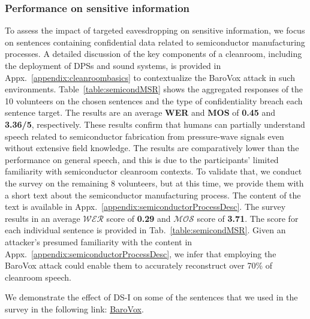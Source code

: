 {{\subsubsection{\textbf{Performance on sensitive information}}
To assess the impact of targeted eavesdropping on sensitive information, we focus on sentences containing confidential data related to semiconductor manufacturing processes. A detailed discussion of the key components of a cleanroom, including the deployment of DPSs and sound systems, is provided in Appx.~\ref{appendix:cleanroombasics} to contextualize the BaroVox attack in such environments.
Table~\ref{table:semicondMSR} shows the aggregated responses of the 10 volunteers on the chosen sentences and the type of confidentiality breach each sentence target. The results are an average \textbf{WER} and \textbf{MOS} of \textbf{0.45} and \textbf{3.36/5}, respectively. These results confirm that humans can partially understand speech related to semiconductor fabrication from pressure-wave signals even without extensive field knowledge. The results are comparatively lower than the performance on general speech,  and this is due to the participants' limited familiarity with semiconductor cleanroom contexts. To validate that, we conduct the survey on the remaining 8 volunteers, but at this time, we provide them with a short text about the semiconductor manufacturing process. The content of the text is available in Appx.~\ref{appendix:semiconductorProcessDesc}. The survey results in an average \textbf{$\mathcal{WER}$} score of \textbf{0.29} and \textbf{$\mathcal{MOS}$} score of \textbf{3.71}. The score for each individual sentence is provided in Tab.~\ref{table:semicondMSR}. Given an attacker's presumed familiarity with the content in Appx.~\ref{appendix:semiconductorProcessDesc}, we infer that employing the BaroVox attack could enable them to accurately reconstruct over 70\% of cleanroom speech. 


We demonstrate the effect of DS-I on some of the sentences that we used in the survey in the following link: 
\textcolor{blue}{\href{https://sites.google.com/view/barovox-a-fly-on-the-wall/home}{{BaroVox}}}.

\setlength{\tabcolsep}{2pt}
\begin{table}[t!]
		\footnotesize
		\centering
			


\end{table}}}
